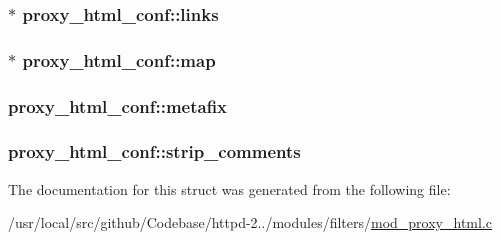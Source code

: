 \subsubsection[{\texorpdfstring{links}{links}}]{$\ast$ proxy\+\_\+html\+\_\+conf\+::links}\hypertarget{structproxy__html__conf_a5bee2ae6e4d45c3348e7ff7934320e55}{}\label{structproxy__html__conf_a5bee2ae6e4d45c3348e7ff7934320e55}
\subsubsection[{\texorpdfstring{map}{map}}]{$\ast$ proxy\+\_\+html\+\_\+conf\+::map}\hypertarget{structproxy__html__conf_a2a8a79c94e0460192ffce1c172e79ccd}{}\label{structproxy__html__conf_a2a8a79c94e0460192ffce1c172e79ccd}
\subsubsection[{\texorpdfstring{metafix}{metafix}}]{ proxy\+\_\+html\+\_\+conf\+::metafix}\hypertarget{structproxy__html__conf_ada897d0c33eaec77b620f2f33f95ed6e}{}\label{structproxy__html__conf_ada897d0c33eaec77b620f2f33f95ed6e}
\subsubsection[{\texorpdfstring{strip\+\_\+comments}{strip_comments}}]{ proxy\+\_\+html\+\_\+conf\+::strip\+\_\+comments}\hypertarget{structproxy__html__conf_a3fbcf74d08936222624b6c051fcf42fa}{}\label{structproxy__html__conf_a3fbcf74d08936222624b6c051fcf42fa}


The documentation for this struct was generated from the following file\+:\begin{DoxyCompactItemize}
\item 
/usr/local/src/github/\+Codebase/httpd-\/2../modules/filters/\hyperlink{mod__proxy__html_8c}{mod\+\_\+proxy\+\_\+html.\+c}\end{DoxyCompactItemize}
